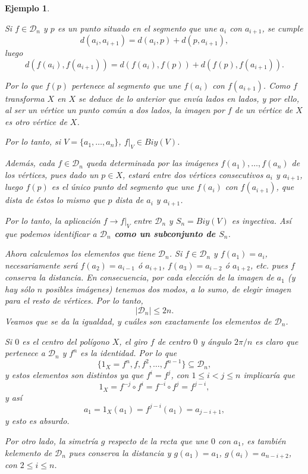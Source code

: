 \documentclass[12pt]{article}
\newtheorem{example}{Ejemplo}[theorem]
\begin{document}
\begin{example}
\begin{enumerate}
Si $f \in \mathcal{D}_{n}$ y $p$ es un punto situado en el segmento que une $a_{i}$ con $a_{i+1}$, se cumple $$d(a_{i}, a_{i+1})= d(a_{i},p) + d(p,a_{i+1}),$$ luego $$d(f(a_{i}), f(a_{i+1}))= d(f(a_{i}),f(p)) + d(f(p),f(a_{i+1})).$$ 

Por lo que $f(p)$ pertenece al segmento que une $f(a_{i})$ con $f(a_{i+1})$. Como $f$ transforma $X$ en $X$ se deduce de lo anterior que envía lados en lados, y por ello, al ser un \textit{vértice} un punto común a dos lados, la imagen por $f$ de un vértice de $X$ es otro vértice de $X$.

Por lo tanto, si $V = \lbrace a_{1}, \ldots, a_{n} \rbrace$, $f|_{V} \in Biy(V)$.

Además, cada $f \in \mathcal{D}_{n}$ queda determinada por las imágenes $f(a_{1}), \ldots, f(a_{n})$ de los vértices, pues dado un $p \in X$, estará entre dos vértices consecutivos $a_{i}$ y $a_{i+1}$, luego $f(p)$ es el único punto del segmento que une $f(a_{i})$ con $f(a_{i+1})$, que dista de éstos lo mismo que $p$ dista de $a_{i}$ y $a_{i+1}$.

Por lo tanto, la aplicación $f \longrightarrow f|_{V}$ entre $\mathcal{D}_{n}$ y $S_{n} = Biy(V)$ es inyectiva. Así que podemos identificar a \textbf{$\mathcal{D}_{n}$ como un subconjunto de $S_{n}$}.

Ahora calculemos los elementos que tiene $\mathcal{D}_{n}$. Si $f \in \mathcal{D}_{n}$ y $f(a_{1}) = a_{i}$, necesariamente será $f(a_{2})= a_{i-1}$ ó $a_{i+1}$, $f(a_{3})=a_{i-2}$ ó $a_{1+2}$, etc. pues $f$ conserva la distancia. En consecuencia, por cada elección de la imagen de $a_{1}$ (y hay sólo $n$ posibles imágenes) tenemos dos modos, a lo sumo, de elegir imagen para el resto de vértices. Por lo tanto, $$|\mathcal{D}_{n}| \leq 2n.$$
Veamos que se da la igualdad, y cuáles son exactamente los elementos de $\mathcal{D}_{n}$.

Si $0$ es el centro del polígono $X$, el giro $f$ de centro $0$ y ángulo $2\pi/ n$ es claro que pertenece a $\mathcal{D}_{n}$ y $f^{n}$ es la identidad. Por lo que $$\lbrace 1_{X} = f^{n}, f, f^{2}, \ldots, f^{n-1} \rbrace \subseteq \mathcal{D}_{n},$$ y estos elementos son distintos ya que $f^{i} = f^{j}$, con $1 \leq i < j \leq n$ implicaría que $$1_{X} = f^{-j}\circ f^{i} = f^{-i} \circ f^{j} = f^{j-i},$$
y así $$a_{1} = 1_{X}(a_{1}) = f^{j-i}(a_{1})= a_{j-i+1},$$
y esto es absurdo.

Por otro lado, la simetría $g$ respecto de la recta que une $0$ con $a_{1}$, es también kelemento de $\mathcal{D}_{n}$ pues conserva la distancia y $g(a_{1}) = a_{1}$, $g(a_{i}) = a_{n-i+2}$, con $2 \leq i \leq n$.


\end{enumerate}
\end{example}
\end{document}
